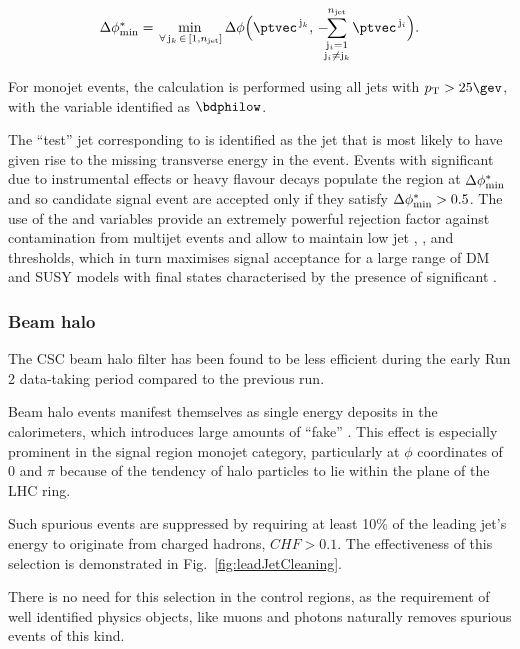 \begin{equation}
  \bdphi = \min_{\,\forall\, \mathrm{j}_k\,\in\, [1,\njet]}
  \Delta\phi \Bigl( \ptvec^{\,\mathrm{j}_k}, \,
    -\hspace{-0.5em}\sum_{\substack{\mathrm{j}_i= 1 \\ \mathrm{j}_i \ne \mathrm{j}_k}}^{\njet}
    \ptvec^{\,\mathrm{j}_i} \Bigr).
  \label{eq:bdphi}
\end{equation}

For monojet events, the calculation is performed using all jets with
$\Pt > 25\gev$, with the variable identified as $\bdphilow$.

The ``test'' jet corresponding to \bdphi is 
identified as the jet that is most likely to have given rise to the
missing transverse energy in the event. Events with significant \mht
due to instrumental effects or heavy flavour decays populate the
region at $\mbox{$\Delta\phi^{*}_{\rm min}$}$ and so candidate signal event are accepted
only if they satisfy $\mbox{$\Delta\phi^{*}_{\rm min}$} > 0.5$. The use of the \bdphi and \alphat
variables provide an extremely powerful rejection factor against
contamination from multijet events and allow to maintain low jet \PT,
\HT, and \mht thresholds, which in turn maximises signal acceptance
for a large range of DM and SUSY models with final states
characterised by the presence of significant \met.

  
\subsubsection{Beam halo}
\label{beam-halo-selection}

The CSC beam halo filter has been found to be less efficient during the early
Run 2 data-taking period compared to the previous run.

Beam halo events manifest themselves as single energy deposits in the
calorimeters, which introduces large amounts of ``fake'' \met. This effect is
especially prominent in the signal region monojet category, particularly at
$\phi$ coordinates of 0 and $\pi$ because of the tendency of halo particles to
lie within the plane of the LHC ring. 

Such spurious events are suppressed by requiring at least 10\% of the leading
jet's energy to originate from charged hadrons, $CHF>0.1$. The effectiveness of this selection
is demonstrated in Fig.~\ref{fig:leadJetCleaning}.

There is no need for this selection in the control regions, 
as the requirement of well identified physics objects, like muons 
and photons naturally removes spurious events of this kind. 

